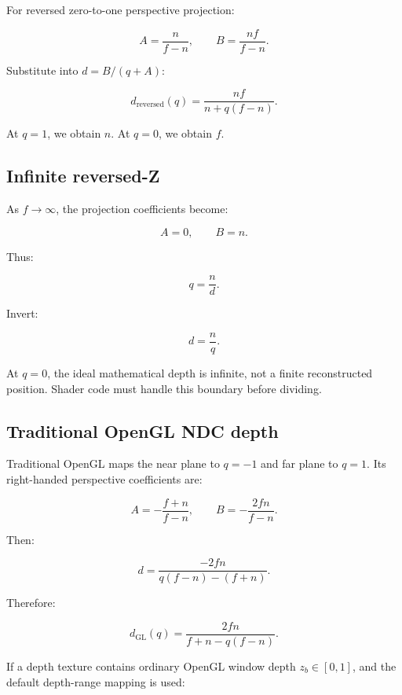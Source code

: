 \hypertarget{02-foundations-ii-ch035-finite-reversed-z}{}

For reversed zero-to-one perspective projection:

\[ A=\frac n{f-n}, \qquad B=\frac{nf}{f-n}. \]

Substitute into \(d=B/(q+A)\):

\[ \boxed{ d_{\mathrm{reversed}}(q) = \frac{nf}{n+q(f-n)}. } \]

At \(q=1\), we obtain \(n\). At \(q=0\), we obtain \(f\).

\subsection{Infinite reversed-Z}\label{02-foundations-ii-ch035-infinite-reversed-z}

\hypertarget{02-foundations-ii-ch035-infinite-reversed-z}{}

As \(f\to\infty\), the projection coefficients become:

\[ A=0,\qquad B=n. \]

Thus:

\[ q=\frac nd. \]

Invert:

\[ \boxed{ d=\frac nq. } \]

At \(q=0\), the ideal mathematical depth is infinite, not a finite reconstructed position. Shader code must handle this boundary before dividing.

\subsection{Traditional OpenGL NDC depth}\label{02-foundations-ii-ch035-traditional-opengl-ndc-depth}

\hypertarget{02-foundations-ii-ch035-traditional-opengl-ndc-depth}{}

Traditional OpenGL maps the near plane to \(q=-1\) and far plane to \(q=1\). Its right-handed perspective coefficients are:

\[ A=-\frac{f+n}{f-n}, \qquad B=-\frac{2fn}{f-n}. \]

Then:

\[ d= \frac{-2fn} {q(f-n)-(f+n)}. \]

Therefore:

\[ \boxed{ d_{\mathrm{GL}}(q)= \frac{2fn}{f+n-q(f-n)}. } \]

If a depth texture contains ordinary OpenGL window depth \(z_b\in[0,1]\), and the default depth-range mapping is used:

